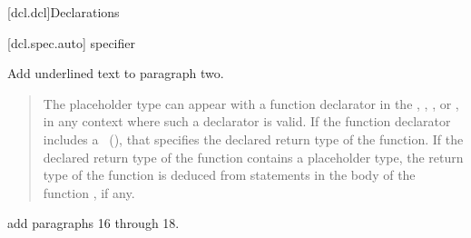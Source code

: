 
\setcounter{chapter}{6}
[dcl.dcl]{Declarations}

\setcounter{section}{1}
\setcounter{subsection}{5}
\setcounter{subsubsection}{3}
[dcl.spec.auto]{ specifier}

Add underlined text to paragraph two.

\begin{quote}
\setcounter{Paras}{1}
\pnum
The placeholder type can appear with a function declarator in the
, ,
, or ,
in any context where such a declarator is valid. If the function declarator
includes a ~(), that specifies
the declared return type of the function. If the declared return type of the
function contains a placeholder type, the return type of the function is
deduced from  statements in the body of the function , if any.
\end{quote}

add paragraphs 16 through 18.

